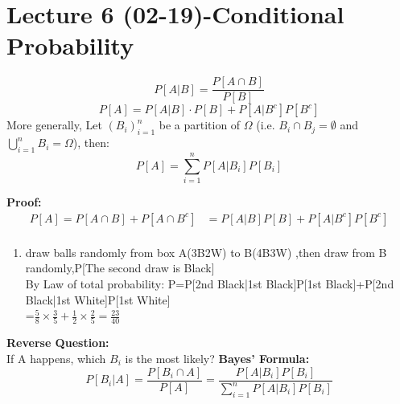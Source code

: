 \section{Lecture 6 (02-19)-{Conditional Probability}}
\begin{definition}{}
    $$
    P[A|B]=\frac{P[A\cap B]}{P[B]}
    $$ 
 $$P[A]=P[A|B]\cdot P[B]+P[A|B^c]P[B^c]$$
 More generally, Let $(B_i)_{i=1}^{n}$ be a partition of $\Omega$ (i.e. $B_i\cap B_j=\emptyset$ and $\bigcup_{i=1}^{n}B_i=\Omega$), then:
    $$P[A]=\sum_{i=1}^{n}P[A|B_i]P[B_i]$$
\end{definition}
\textbf{Proof:} 
\begin{align*}{}{}
P[A]=P[A\cap B]+P[A\cap B^c]&=P[A|B]P[B]+P[A|B^c]P[B^c]\\
\end{align*}
\begin{example}[]{}
 \begin{enumerate}[label=\circled{\arabic*}] 
 \item draw balls randomly from box A(3B2W) to B(4B3W) ,then draw from B randomly,P[The second draw is Black]
 \\By Law of total probability: P=P[2nd Black|1st Black]P[1st Black]+P[2nd Black|1st White]P[1st White]\\
 =$ \frac{5}{8}\times \frac{3}{5}+\frac{1}{2}\times\frac{2}{5}=\frac{23}{40} $ 
 \end{enumerate}
\end{example}
\textbf{Reverse Question:}  
\\If A happens, which $ B_i $ is the most likely? \textbf{Bayes' Formula:}
$$
    P[B_i|A]=\frac{P[B_i\cap A]}{P[A]}=\frac{P[A|B_i]P[B_i]}{\sum_{i=1}^{n}P[A|B_i]P[B_i]}
$$ 
